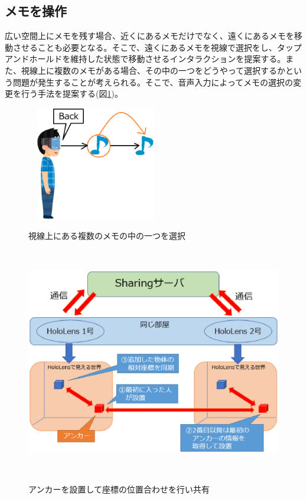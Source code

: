 \documentclass{hissymp}
\begin{document}
\subsection{メモを操作}
広い空間上にメモを残す場合、近くにあるメモだけでなく、遠くにあるメモを移動させることも必要となる。そこで、遠くにあるメモを視線で選択をし、タップアンドホールドを維持した状態で移動させるインタラクションを提案する。また、視線上に複数のメモがある場合、その中の一つをどうやって選択するかという問題が発生することが考えられる。そこで、音声入力によってメモの選択の変更を行う手法を提案する(図\ref{fig:sentaku_memo})。

\begin{figure}[h]
  \begin{center}
    \includegraphics[clip,height=5.0cm,width=6.0cm]{./sentaku_memo.eps}
    \caption{視線上にある複数のメモの中の一つを選択}
    \label{fig:sentaku_memo}
  \end{center}
\end{figure}

\begin{figure}[t]
  \begin{center}
    \includegraphics[clip,height=10.0cm,width=14.0cm]{./sharing.eps}
    \caption{アンカーを設置して座標の位置合わせを行い共有}
    \label{fig:sharing}
  \end{center}
\end{figure}
\end{document}
